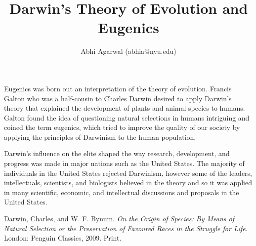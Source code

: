 \documentclass[11pt, oneside]{article}
\title{Darwin's Theory of Evolution and Eugenics}
\author{Abhi Agarwal (abhia@nyu.edu)}
\date{}
\begin{document}
\maketitle

\par 

\par Eugenics was born out an interpretation of the theory of evolution. Francis Galton who was a half-cousin to Charles Darwin desired to apply Darwin's theory that explained the development of plants and animal species to humans. Galton found the idea of questioning natural selections in humans intriguing and coined the term eugenics, which tried to improve the quality of our society by applying the principles of Darwinism to the human population. 

\par Darwin's influence on the elite shaped the way research, development, and progress was made in major nations such as the United States. The majority of individuals in the United States rejected Darwinism, however some of the leaders, intellectuals, scientists, and biologists believed in the theory and so it was applied in many scientific, economic, and intellectual discussions and proposals in the United States. 


\begin{thebibliography}{9}
  Darwin, Charles, and W. F. Bynum.
  \emph{On the Origin of Species: By Means of Natural Selection or the Preservation of Favoured Races in the Struggle for Life}.
  London: Penguin Classics, 2009.
  Print.

\end{thebibliography}
\end{document}
